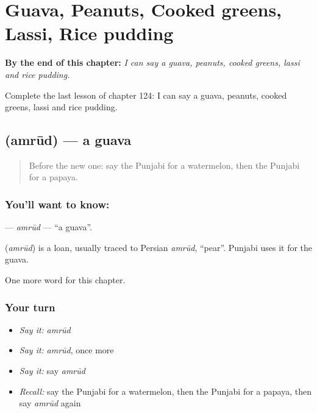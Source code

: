 
\chapter{Guava, Peanuts, Cooked greens, Lassi, Rice pudding}
\label{ch:pa-guava-peanuts-cooked-greens-lassi-rice-pudding}

\begin{chapteropening}
\textbf{By the end of this chapter:} \emph{I can say a guava, peanuts, cooked greens, lassi and rice pudding.}

Complete the last lesson of chapter 124: I can say a guava, peanuts, cooked greens, lassi and rice pudding.
\end{chapteropening}

\section[\texorpdfstring{\pa{ਅਮਰੂਦ} (amrūd)}{ਅਮਰੂਦ (amrūd)}]{ (amrūd) — a guava}

\label{lesson:PA-C124-amrud}



\begin{quote}
Before the new one: say the Punjabi for a watermelon, then the Punjabi for a papaya.
\end{quote}

\subsection*{You'll want to know: }
\textbf{} — \emph{amrūd} — \textquotedblleft{}a guava\textquotedblright{}.

\begin{cousinweb}
\textbf{} (\emph{amrūd}) is a loan, usually traced to Persian \emph{amrūd}, \textquotedblleft{}pear\textquotedblright{}. Punjabi uses it for the guava.
\end{cousinweb}

\begin{grammarlens}[title={What you've built}]
One more word for this chapter.
\end{grammarlens}

\subsection*{Your turn}
\begin{itemize}
\raggedright
  \item \emph{Say it:} \emph{amrūd}
  \item \emph{Say it:} \emph{amrūd}, once more
  \item \emph{Say it:} say \emph{amrūd}
  \item \emph{Recall:} say the Punjabi for a watermelon, then the Punjabi for a papaya, then say \emph{amrūd} again
\end{itemize}

